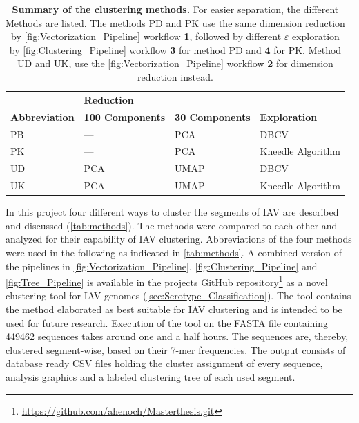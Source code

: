 \begin{table}[!hbt]
    \footnotesize
    \centering
    \caption[Summary of the clustering methods]{\textbf{Summary of the clustering methods.} For easier separation, the different Methods are listed. The methods PD and PK use the same dimension reduction by \autoref{fig:Vectorization_Pipeline} workflow \textsf{\textbf{1}}, followed by different $\varepsilon$ exploration by \autoref{fig:Clustering_Pipeline} workflow \textsf{\textbf{3}} for method PD and \textsf{\textbf{4}} for PK. Method UD and UK, use the \autoref{fig:Vectorization_Pipeline} workflow \textsf{\textbf{2}} for dimension reduction instead.}
    \label{tab:methods}
    \begin{tabular*}{0.85\textwidth}{@{\extracolsep{\fill}\hspace{6pt}}llll}
        \toprule
        & \multicolumn{2}{l}{\textbf{Reduction}} & \\
        \cmidrule(lr){2-3}
        \textbf{Abbreviation} & \textbf{100 Components} & \textbf{30 Components} & \textbf{Exploration}\\
        \midrule
        PB & --- & PCA & DBCV\\
        PK & --- & PCA & Kneedle Algorithm\\
        UD & PCA & UMAP & DBCV\\
        UK & PCA & UMAP & Kneedle Algorithm\\
        \bottomrule
    \end{tabular*}
\end{table}

In this project four different ways to cluster the segments of \gls{IAV} are described and discussed (\autoref{tab:methods}). The methods were compared to each other and analyzed for their capability of \gls{IAV} clustering. Abbreviations of the four methods were used in the following as indicated in \autoref{tab:methods}. A combined version of the pipelines in \autoref{fig:Vectorization_Pipeline}, \autoref{fig:Clustering_Pipeline} and \autoref{fig:Tree_Pipeline} is available in the projects GitHub repository\footnote{\url{https://github.com/ahenoch/Masterthesis.git}} as a novel clustering tool for \gls{IAV} genomes (\autoref{sec:Serotype_Classification}). The tool contains the method elaborated as best suitable for \gls{IAV} clustering and is intended to be used for future research. Execution of the tool on the FASTA file containing 449462 sequences takes around one and a half hours. The sequences are, thereby, clustered segment-wise, based on their 7-mer frequencies. The output consists of database ready CSV files holding the cluster assignment of every sequence, analysis graphics and a labeled clustering tree of each used segment. 

